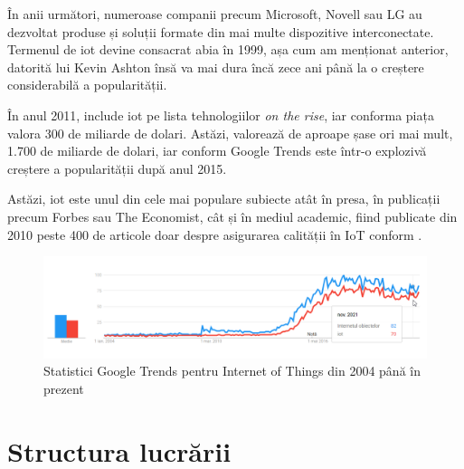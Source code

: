 

În anii următori, numeroase companii precum Microsoft, Novell sau LG au dezvoltat produse și soluții formate din mai multe dispozitive interconectate. Termenul de \acrlong{iot} devine consacrat abia în 1999, așa cum am menționat anterior, datorită lui Kevin Ashton însă va mai dura încă zece ani până la o creștere considerabilă a popularității.

În anul 2011, \cite{Gartner2011} include \acrlong{iot} pe lista tehnologiilor \textit{on the rise}, iar conforma \cite{statistaIot} piața valora 300 de miliarde de dolari. Astăzi, valorează de aproape șase ori mai mult, 1.700 de miliarde de dolari, iar conform Google Trends este într-o explozivă creștere a popularității după anul 2015.

Astăzi, \acrlong{iot} este unul din cele mai populare subiecte atât în presa, în publicații precum Forbes sau The Economist, cât și în mediul academic, fiind publicate din 2010 peste 400 de articole doar despre asigurarea calității în IoT conform \cite{Ahmed2019}.

\begin{figure}[h]
\caption{Statistici Google Trends pentru Internet of Things din 2004 până în prezent}
\centering
\includegraphics[width=\textwidth]{images/trends_iot.png}
\end{figure}


\section{Structura lucrării}

